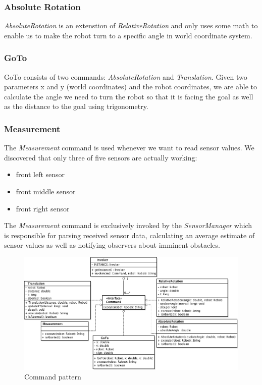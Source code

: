\documentclass[703030]{iisreport}
\begin{document}
\subsubsection{Absolute Rotation}
\emph{AbsoluteRotation} is an extenstion of \emph{RelativeRotation} and only uses 
some math to enable us to make the robot turn to a specific angle in world 
coordinate system.

\subsubsection{GoTo}
GoTo consists of two commands: \emph{AbsoluteRotation} and \emph{Translation}. 
Given two parameters x and y (world coordinates) and the robot coordinates, we are
able to calculate the angle we need to turn the robot so that it is facing the goal
as well as the distance to the goal using trigonometry.

\subsubsection{Measurement}
The \emph{Measurement} command is used whenever we want to read sensor values. We
discovered that only three of five sensors are actually working:
\begin{itemize}
	\item front left sensor
	\item front middle sensor
	\item front right sensor
\end{itemize}
The \emph{Measurement} command is exclusively invoked by the \emph{SensorManager}
which is responsible for parsing received sensor data, calculating an average estimate
of sensor values as well as notifying observers about imminent obstacles.

\begin{figure}
	\centering
	\includegraphics[width=\textwidth,height=\textheight,keepaspectratio]{commandpattern.png}
	\caption{Command pattern}
	\label{img:commandpattern}
\end{figure}
\end{document}
